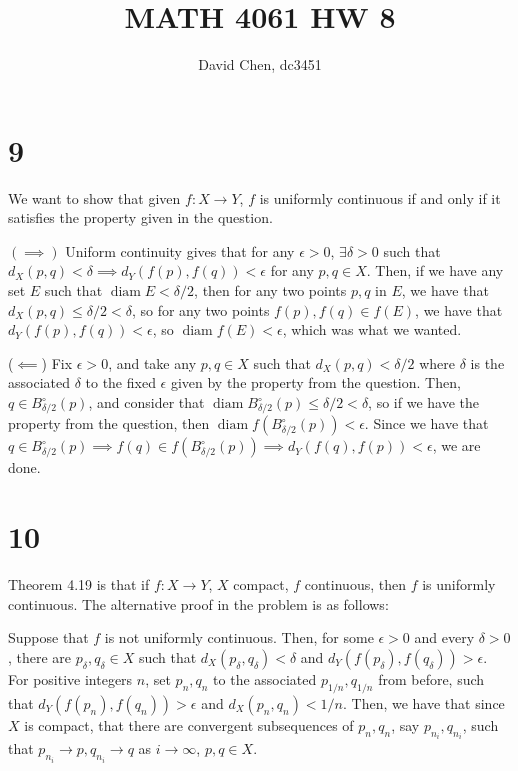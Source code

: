 \documentclass[12pt,letterpaper]{article}
\title{MATH 4061 HW 8}
\author{David Chen, dc3451}
\theoremstyle{definition}
\DeclareMathOperator{\diam}{diam}
\begin{document}
\section*{9}

We want to show that given $f: X \rightarrow Y$, $f$ is uniformly continuous if and only if it satisfies the property given in the question.

$(\implies)$ Uniform continuity gives that for any $\epsilon > 0$, $\exists \delta > 0$ such that $d_{X}(p,q) < \delta \implies d_{Y}(f(p),f(q)) < \epsilon$ for any $p, q \in X$. Then, if we have any set $E$ such that $\diam E < \delta/2$, then for any two points $p, q$ in $E$, we have that $d_{X}(p, q) \leq \delta / 2 < \delta$, so for any two points $f(p), f(q) \in f(E)$, we have that $d_{Y}(f(p), f(q)) < \epsilon$, so $\diam f(E) < \epsilon$, which was what we wanted.

($\impliedby$) Fix $\epsilon > 0$, and take any $p, q \in X$ such that $d_{X}(p,q) < \delta / 2$ where $\delta$ is the associated $\delta$ to the fixed $\epsilon$ given by the property from the question. Then, $q \in B_{\delta/2}^{\circ}(p)$, and consider that $\diam B_{\delta/2}^{\circ}(p) \leq \delta/2 < \delta$, so if we have the property from the question, then $\diam f(B_{\delta/2}^{\circ}(p)) < \epsilon$. Since we have that $q \in B_{\delta/2}^{\circ}(p) \implies f(q) \in f(B_{\delta/2}^{\circ}(p)) \implies d_{Y}(f(q), f(p)) < \epsilon$, we are done.

\section*{10}

Theorem 4.19 is that if $f: X \rightarrow Y$, $X$ compact, $f$ continuous, then $f$ is uniformly continuous. The alternative proof in the problem is as follows:

Suppose that $f$ is not uniformly continuous. Then, for some $\epsilon > 0$ and every $\delta > 0$, there are $p_{\delta}, q_{\delta} \in X$ such that $d_{X}(p_{\delta}, q_{\delta}) < \delta$ and $d_{Y}(f(p_{\delta}), f(q_{\delta})) > \epsilon$. For positive integers $n$, set $p_{n}, q_{n}$ to the associated $p_{1/n}, q_{1/n}$ from before, such that $d_{Y}(f(p_{n}), f(q_{n})) > \epsilon$ and $d_{X}(p_{n}, q_{n}) < 1/n$. Then, we have that since $X$ is compact, that there are convergent subsequences of $p_{n}, q_{n}$, say $p_{n_{i}}, q_{n_{i}}$, such that $p_{n_{i}} \rightarrow p, q_{n_{i}} \rightarrow q$ as $i \rightarrow \infty$, $p, q \in X$.
\end{document}
